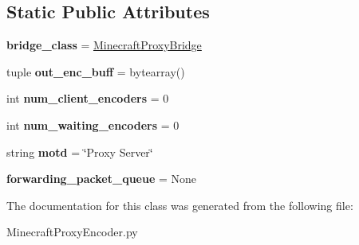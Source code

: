 \subsection*{Static Public Attributes}
\begin{DoxyCompactItemize}
\item 
\hypertarget{classMinecraftProxyEncoder_1_1MinecraftProxyFactory_a16144e5f1caf08c9bc6396380726bada}{{\bfseries bridge\-\_\-class} = \hyperlink{classMinecraftProxyEncoder_1_1MinecraftProxyBridge}{Minecraft\-Proxy\-Bridge}}\label{classMinecraftProxyEncoder_1_1MinecraftProxyFactory_a16144e5f1caf08c9bc6396380726bada}

\item 
\hypertarget{classMinecraftProxyEncoder_1_1MinecraftProxyFactory_a5bdfd03a645f87a5a770c5c2db2de89b}{tuple {\bfseries out\-\_\-enc\-\_\-buff} = bytearray()}\label{classMinecraftProxyEncoder_1_1MinecraftProxyFactory_a5bdfd03a645f87a5a770c5c2db2de89b}

\item 
\hypertarget{classMinecraftProxyEncoder_1_1MinecraftProxyFactory_a10c3127c70951d77d35286af69479495}{int {\bfseries num\-\_\-client\-\_\-encoders} = 0}\label{classMinecraftProxyEncoder_1_1MinecraftProxyFactory_a10c3127c70951d77d35286af69479495}

\item 
\hypertarget{classMinecraftProxyEncoder_1_1MinecraftProxyFactory_ac16630c00870f6438365c686f9d8725a}{int {\bfseries num\-\_\-waiting\-\_\-encoders} = 0}\label{classMinecraftProxyEncoder_1_1MinecraftProxyFactory_ac16630c00870f6438365c686f9d8725a}

\item 
\hypertarget{classMinecraftProxyEncoder_1_1MinecraftProxyFactory_a0b1a71c543eb4aec0157b2d9ee542897}{string {\bfseries motd} = \char`\"{}Proxy Server\char`\"{}}\label{classMinecraftProxyEncoder_1_1MinecraftProxyFactory_a0b1a71c543eb4aec0157b2d9ee542897}

\item 
\hypertarget{classMinecraftProxyEncoder_1_1MinecraftProxyFactory_a6952a9c6fef1a9cafe035d4a6d0195b4}{{\bfseries forwarding\-\_\-packet\-\_\-queue} = None}\label{classMinecraftProxyEncoder_1_1MinecraftProxyFactory_a6952a9c6fef1a9cafe035d4a6d0195b4}

\end{DoxyCompactItemize}


The documentation for this class was generated from the following file\-:\begin{DoxyCompactItemize}
\item 
Minecraft\-Proxy\-Encoder.\-py\end{DoxyCompactItemize}
